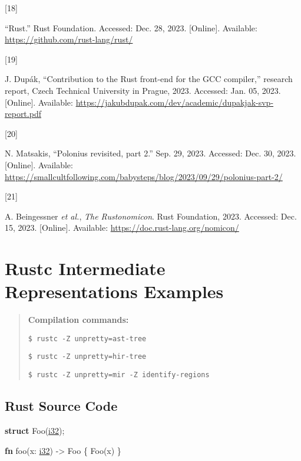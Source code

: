 \documentclass[
  11pt,
  twoside,symmetric]{report}
\newenvironment{Shaded}{}{}
\newcommand{\DataTypeTok}[1]{\underline{#1}}
\newcommand{\KeywordTok}[1]{\textbf{#1}}
\newcommand{\NormalTok}[1]{#1}
\newcommand{\OperatorTok}[1]{#1}
\newlength{\cslhangindent}
\newlength{\csllabelwidth}
\newenvironment{CSLReferences}[2] %
 {\begin{list}{}{%
  \setlength{\itemindent}{0pt}
  \setlength{\leftmargin}{0pt}
  \setlength{\parsep}{0pt}
  \ifodd #1
   \setlength{\leftmargin}{\cslhangindent}
   \setlength{\itemindent}{-1\cslhangindent}
  \fi
  \setlength{\itemsep}{#2\baselineskip}}}
 {\end{list}}
\newcommand{\CSLLeftMargin}[1]{\parbox[t]{\csllabelwidth}{\strut#1\strut}}
\newcommand{\CSLRightInline}[1]{\parbox[t]{\linewidth - \csllabelwidth}{\strut#1\strut}}
\begin{document}
\begin{CSLReferences}{0}{0}
\CSLLeftMargin{{[}18{]} }%
\CSLRightInline{{``Rust.''} Rust Foundation. Accessed: Dec. 28, 2023.
{[}Online{]}. Available: \url{https://github.com/rust-lang/rust/}}

\CSLLeftMargin{{[}19{]} }%
\CSLRightInline{J. Dupák, {``Contribution to the {R}ust front-end for
the {GCC} compiler,''} research report, Czech Technical University in
Prague, 2023. Accessed: Jan. 05, 2023. {[}Online{]}. Available:
\url{https://jakubdupak.com/dev/academic/dupakjak-svp-report.pdf}}

\CSLLeftMargin{{[}20{]} }%
\CSLRightInline{N. Matsakis, {``Polonius revisited, part 2.''} Sep. 29,
2023. Accessed: Dec. 30, 2023. {[}Online{]}. Available:
\url{https://smallcultfollowing.com/babysteps/blog/2023/09/29/polonius-part-2/}}

\CSLLeftMargin{{[}21{]} }%
\CSLRightInline{A. Beingessner \emph{et al.}, \emph{The {R}ustonomicon}.
Rust Foundation, 2023. Accessed: Dec. 15, 2023. {[}Online{]}. Available:
\url{https://doc.rust-lang.org/nomicon/}}

\end{CSLReferences}

\chapter{Rustc Intermediate Representations
Examples}\label{sec:rustc-intermediate-representations-examples}

\begin{quote}
\textbf{Compilation commands:}

\texttt{\$\ rustc\ -Z\ unpretty=ast-tree}

\texttt{\$\ rustc\ -Z\ unpretty=hir-tree}

\texttt{\$\ rustc\ -Z\ unpretty=mir\ -Z\ identify-regions}
\end{quote}

\section{Rust Source Code}\label{sec:rust-source-code}

\begin{Shaded}
\begin{Highlighting}[]
    \KeywordTok{struct}\NormalTok{ Foo(}\DataTypeTok{i32}\NormalTok{)}\OperatorTok{;}

    \KeywordTok{fn}\NormalTok{ foo(x}\OperatorTok{:} \DataTypeTok{i32}\NormalTok{) }\OperatorTok{{-}\textgreater{}}\NormalTok{ Foo }\OperatorTok{\{}
\NormalTok{        Foo(x)}
    \OperatorTok{\}}
\end{Highlighting}
\end{Shaded}
\end{document}
